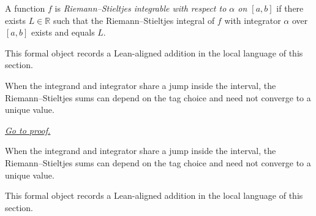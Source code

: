 \begin{remark*}
A function $f$ is \emph{Riemann--Stieltjes integrable with respect to $\alpha$ on $[a,b]$} if there exists $L\in\mathbb R$ such that the Riemann--Stieltjes integral of $f$ with integrator $\alpha$ over $[a,b]$ exists and equals $L$.
\end{remark*}

\begin{remark*}[Interpretation]
This formal object records a Lean-aligned addition in the local language of this section.
\end{remark*}

\begin{dependencies}
\NoLocalDependencies
\end{dependencies}
\begin{theorem}
\label{thm:rs-shared-jump-failure-witness}
When the integrand and integrator share a jump inside the interval, the Riemann--Stieltjes sums can depend on the tag choice and need not converge to a unique value.

\smallskip
\noindent
\hyperref[prf:rs-shared-jump-failure-witness]{\textit{Go to proof.}}
\end{theorem}

\begin{remark*}
When the integrand and integrator share a jump inside the interval, the Riemann--Stieltjes sums can depend on the tag choice and need not converge to a unique value.
\end{remark*}

\begin{remark*}[Interpretation]
This formal object records a Lean-aligned addition in the local language of this section.
\end{remark*}

\begin{dependencies}
\NoLocalDependencies
\end{dependencies}
